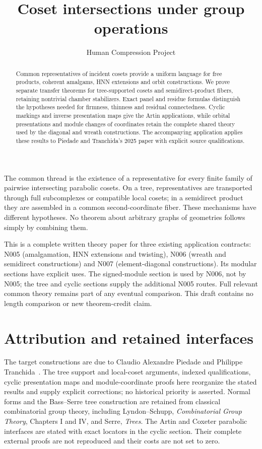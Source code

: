 
\title{Coset intersections under group operations}
\author{Human Compression Project}\date{}
\maketitle
\begin{abstract}
Common representatives of incident cosets provide a uniform language for free products, coherent amalgams, HNN extensions and orbit constructions. We prove separate transfer theorems for tree-supported cosets and semidirect-product fibers, retaining nontrivial chamber stabilizers. Exact panel and residue formulas distinguish the hypotheses needed for firmness, thinness and residual connectedness. Cyclic markings and inverse presentation maps give the Artin applications, while orbital presentations and module changes of coordinates retain the complete shared theory used by the diagonal and wreath constructions. The accompanying application applies these results to Piedade and Tranchida's 2025 paper with explicit source qualifications.
\end{abstract}
The common thread is the existence of a representative for every finite family of pairwise intersecting parabolic cosets. On a tree, representatives are transported through full subcomplexes or compatible local cosets; in a semidirect product they are assembled in a common second-coordinate fiber. These mechanisms have different hypotheses. No theorem about arbitrary graphs of geometries follows simply by combining them.

This is a complete written theory paper for three existing application contracts: N005 (amalgamation, HNN extensions and twisting), N006 (wreath and semidirect constructions) and N007 (element-diagonal constructions). Its modular sections have explicit uses. The signed-module section is used by N006, not by N005; the tree and cyclic sections supply the additional N005 routes. Full relevant common theory remains part of any eventual comparison. This draft contains no length comparison or new theorem-credit claim.







\section{Attribution and retained interfaces}
The target constructions are due to Claudio Alexandre Piedade and Philippe Tranchida~\cite{N005,N006,N007}. The tree support and local-coset arguments, indexed qualifications, cyclic presentation maps and module-coordinate proofs here reorganize the stated results and supply explicit corrections; no historical priority is asserted. Normal forms and the Bass--Serre tree construction are retained from classical combinatorial group theory, including Lyndon--Schupp, \emph{Combinatorial Group Theory}, Chapters I and IV, and Serre, \emph{Trees}. The Artin and Coxeter parabolic interfaces are stated with exact locators in the cyclic section. Their complete external proofs are not reproduced and their costs are not set to zero.

